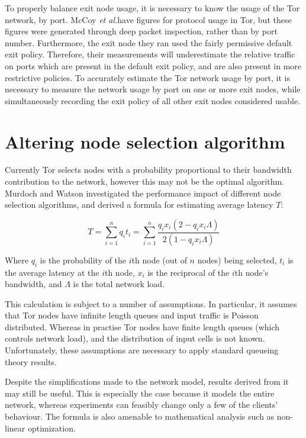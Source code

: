 \documentclass{article}
\makeatletter
\newcommand{\etal}{\textit{et al.\@\xspace}}
\makeatother
\begin{document}
To properly balance exit node usage, it is necessary to know the usage of the Tor network, by port.
McCoy \etal have figures for protocol usage in Tor, but these figures were generated through deep packet inspection, rather than by port number.
Furthermore, the exit node they ran used the fairly permissive default exit policy.
Therefore, their measurements will underestimate the relative traffic on ports which are present in the default exit policy, and are also present in more restrictive policies.
To accurately estimate the Tor network usage by port, it is necessary to measure the network usage by port on one or more exit nodes, while simultaneously recording the exit policy of all other exit nodes considered usable.

\section{Altering node selection algorithm}

Currently Tor selects nodes with a probability proportional to their bandwidth contribution to the network, however this may not be the optimal algorithm.
Murdoch and Watson investigated the performance impact of different node selection algorithms, and derived a formula for estimating average latency $T$:

\begin{equation}
T = \sum_{i=1}^n q_i t_i = \sum_{i=1}^n \frac{q_i x_i (2 - q_i x_i \Lambda)}{2 (1 - q_i x_i \Lambda)}
\label{eqn:waiting}
\end{equation}

Where $q_i$ is the probability of the $i$th node (out of $n$ nodes) being selected, $t_i$ is the average latency at the $i$th node, $x_i$ is the reciprocal of the $i$th node's bandwidth, and $\Lambda$ is the total network load.

This calculation is subject to a number of assumptions.
In particular, it assumes that Tor nodes have infinite length queues and input traffic is Poisson distributed.
Whereas in practise Tor nodes have finite length queues (which controls network load), and the distribution of input cells is not known.
Unfortunately, these assumptions are necessary to apply standard queueing theory results.

Despite the simplifications made to the network model, results derived from it may still be useful.
This is especially the case because it models the entire network, whereas experiments can feasibly change only a few of the clients' behaviour.
The formula is also amenable to mathematical analysis such as non-linear optimization.
\end{document}

